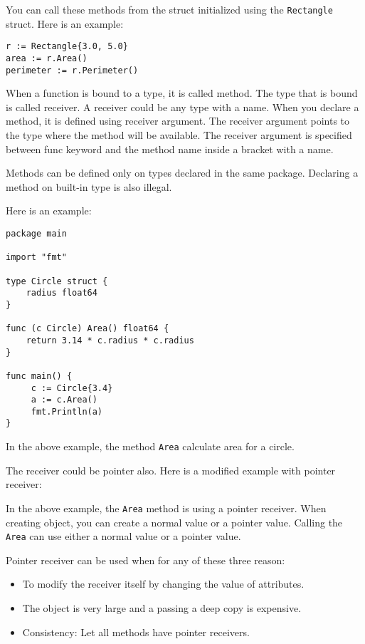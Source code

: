 You can call these methods from the struct initialized using
the \texttt{Rectangle} struct.  Here is an example:

\begin{lstlisting}[numbers=none]
r := Rectangle{3.0, 5.0}
area := r.Area()
perimeter := r.Perimeter()
\end{lstlisting}

When a function is bound to a type, it is called method.
The type that is bound is called receiver.  A receiver could be any
type with a name.  When you declare a method, it is defined using
receiver argument.  The receiver argument points to the type where the
method will be available.  The receiver argument is specified between
func keyword and the method name inside a bracket with a name.

Methods can be defined only on types declared in the same package.
Declaring a method on built-in type is also illegal.

Here is an example:

\begin{lstlisting}
package main

import "fmt"

type Circle struct {
    radius float64
}

func (c Circle) Area() float64 {
    return 3.14 * c.radius * c.radius
}

func main() {
     c := Circle{3.4}
     a := c.Area()
     fmt.Println(a)
}
\end{lstlisting}


In the above example, the method \texttt{Area} calculate area for a
circle.

The receiver could be pointer also.  Here is a modified example with
pointer receiver:



In the above example, the \texttt{Area} method is using a pointer
receiver.  When creating object, you can create a normal value or a
pointer value.  Calling the \texttt{Area} can use either a normal
value or a pointer value.

Pointer receiver can be used when for any of
these three reason:

\begin{itemize}
\item To modify the receiver itself by changing the value of attributes.
\item The object is very large and a passing a deep copy is expensive.
\item Consistency: Let all methods have pointer receivers.
\end{itemize}

